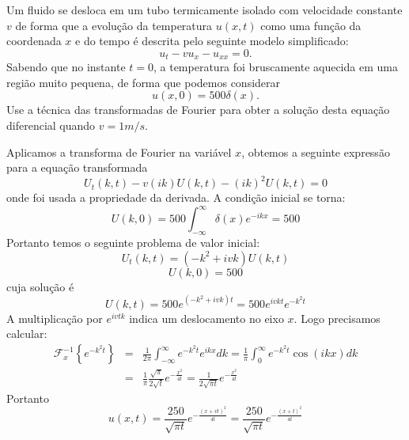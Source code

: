 \begin{Exercise}
Um fluido se desloca em um tubo termicamente isolado com velocidade constante $v$ de forma que a evolução da temperatura $u(x,t)$ como uma função da coordenada $x$ e do tempo é descrita pelo seguinte modelo simplificado:
$$u_t-vu_x-u_{xx}=0.$$
Sabendo que no instante $t=0$, a temperatura foi bruscamente aquecida em uma região muito pequena, de forma que podemos considerar
$$u(x,0)=500 \delta(x).$$ 
Use a técnica das transformadas de Fourier para obter a solução desta equação diferencial quando $v=1m/s$.
\end{Exercise}
\begin{Answer}
Aplicamos a transforma de Fourier na variável $x$, obtemos a seguinte expressão para a equação transformada
$$U_t(k,t)-v(ik)U(k,t)-(ik)^2U(k,t)=0$$
onde foi usada a propriedade da derivada.
A condição inicial se torna:
$$U(k,0)=500\int_{-\infty}^\infty \delta(x)e^{-ikx}=500$$
Portanto temos o seguinte problema de valor inicial:
$$U_t(k,t)=(-k^2+ivk)U(k,t)$$
$$U(k,0)=500$$
cuja solução é
$$U(k,t)=500e^{(-k^2+ivk)t}=500 e^{ivkt}e^{-k^2t}$$
A multiplicação por $e^{ivtk}$ indica um deslocamento no eixo $x$. Logo precisamos calcular:
\begin{eqnarray*}
\mathcal{F}^{-1}_x\left\{e^{-k^2t}\right\}&=&\frac{1}{2\pi}\int_{-\infty}^\infty e^{-k^2t} e^{ikx}dk=\frac{1}{\pi}\int_{0}^\infty e^{-k^2t} \cos({ikx})dk\\
&=&\frac{1}{\pi}\frac{\sqrt{\pi}}{2\sqrt{t}}e^{-\frac{x^2}{4t}}=\frac{1}{2\sqrt{\pi t}}e^{-\frac{x^2}{4t}}
\end{eqnarray*}
Portanto
$$u(x,t)=\frac{250}{\sqrt{\pi t}}e^{-\frac{(x+vt)^2}{4t}}=\frac{250}{\sqrt{\pi t}}e^{-\frac{(x+t)^2}{4t}}$$

\end{Answer}

